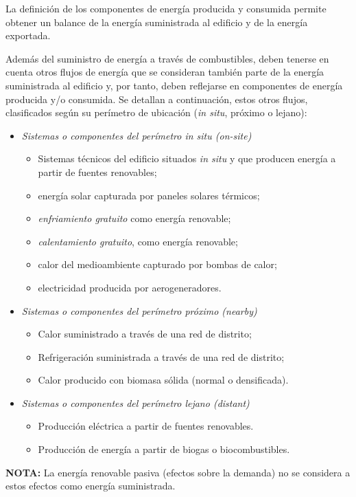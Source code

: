 \documentclass[10pt,notitlepage,oneside,a4paper]{article}
\begin{document}
\begin{myquote}\small
La definición de los componentes de energía producida y consumida permite obtener un balance de la energía suministrada al edificio y de la energía exportada.

Además del suministro de energía a través de combustibles, deben tenerse en cuenta otros flujos de energía que se consideran también parte de la energía suministrada al edificio y, por tanto, deben reflejarse en componentes de energía producida y/o consumida. Se detallan a continuación, estos otros flujos, clasificados según su perímetro de ubicación (\textit{in situ}, próximo o lejano):

\begin{itemize}
\item \textit{Sistemas o componentes del perímetro \textit{in situ} (on-site)}

\begin{itemize}
\item Sistemas técnicos del edificio situados \textit{in situ} y que producen energía a partir de fuentes renovables;
\item energía solar capturada por paneles solares térmicos;
\item \textit{enfriamiento gratuito} como energía renovable;
\item \textit{calentamiento gratuito}, como energía renovable;
\item calor del medioambiente capturado por bombas de calor;
\item electricidad producida por aerogeneradores.
\end{itemize}

\item \textit{Sistemas o componentes del perímetro \textit{próximo} (nearby)}

\begin{itemize}
\item Calor suministrado a través de una red de distrito;
\item Refrigeración suministrada a través de una red de distrito;
\item Calor producido con biomasa sólida (normal o densificada).
\end{itemize}

\item \textit{Sistemas o componentes del perímetro \textit{lejano} (distant)}

\begin{itemize}
\item Producción eléctrica a partir de fuentes renovables.
\item Producción de energía a partir de biogas o biocombustibles.
\end{itemize}
\end{itemize}

\textbf{NOTA:} La energía renovable pasiva (efectos sobre la demanda) no se considera a estos efectos como energía suministrada.
\end{myquote}
\end{document}
